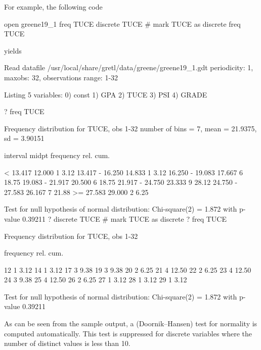 For example, the following code
%
\begin{code}
open greene19_1
freq TUCE
discrete TUCE # mark TUCE as discrete
freq TUCE
\end{code}
%
yields
%
\begin{code}
Read datafile /usr/local/share/gretl/data/greene/greene19_1.gdt
periodicity: 1, maxobs: 32,
observations range: 1-32

Listing 5 variables:
  0) const    1) GPA      2) TUCE     3) PSI      4) GRADE  

? freq TUCE

Frequency distribution for TUCE, obs 1-32
number of bins = 7, mean = 21.9375, sd = 3.90151

       interval          midpt   frequency    rel.     cum.

          <  13.417     12.000        1      3.12%
    13.417 - 16.250     14.833        1      3.12%
    16.250 - 19.083     17.667        6     18.75%
    19.083 - 21.917     20.500        6     18.75%
    21.917 - 24.750     23.333        9     28.12%
    24.750 - 27.583     26.167        7     21.88%
          >= 27.583     29.000        2      6.25%

Test for null hypothesis of normal distribution:
Chi-square(2) = 1.872 with p-value 0.39211
? discrete TUCE # mark TUCE as discrete
? freq TUCE

Frequency distribution for TUCE, obs 1-32

          frequency    rel.     cum.

  12           1      3.12%
  14           1      3.12%
  17           3      9.38%
  19           3      9.38%
  20           2      6.25%
  21           4     12.50%
  22           2      6.25%
  23           4     12.50%
  24           3      9.38%
  25           4     12.50%
  26           2      6.25%
  27           1      3.12%
  28           1      3.12%
  29           1      3.12%

Test for null hypothesis of normal distribution:
Chi-square(2) = 1.872 with p-value 0.39211
\end{code}
%
As can be seen from the sample output, a (Doornik--Hansen) test for
normality is computed automatically.  This test is suppressed for
discrete variables where the number of distinct values is less than
10.

